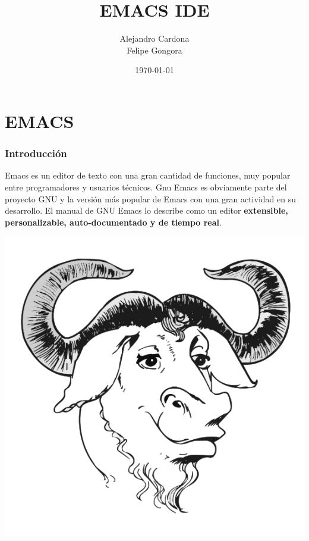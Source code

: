 \documentclass{beamer}
\title{EMACS IDE}
\author{Alejandro Cardona \\ Felipe Gongora}
\date{\today}
\begin{document}
\frame{\titlepage}

\section[\'Indice]{}
\begin{frame}[allowframebreaks]
\tableofcontents
\end{frame}

\section{EMACS}
\begin{frame}[allowframebreaks]
\frametitle{Introducci\'on}
Emacs es un editor de texto con una gran cantidad de funciones, muy popular entre programadores y usuarios t\'ecnicos. Gnu Emacs es obviamente parte del proyecto GNU y la versión m\'as popular de Emacs con una gran actividad en su desarrollo. El manual de GNU Emacs lo describe como un editor \textbf{extensible, personalizable, auto-documentado y de tiempo real}.
\begin{center}
\includegraphics[height=0.3\textheight]{img/emacs.png}
\end{center}
\end{frame}
\end{document}
